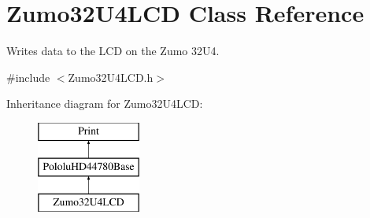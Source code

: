 \hypertarget{class_zumo32_u4_l_c_d}{}\section{Zumo32\+U4\+L\+CD Class Reference}
\label{class_zumo32_u4_l_c_d}


Writes data to the L\+CD on the Zumo 32\+U4.  




{\ttfamily \#include $<$Zumo32\+U4\+L\+C\+D.\+h$>$}

Inheritance diagram for Zumo32\+U4\+L\+CD\+:\begin{figure}[H]
\begin{center}
\leavevmode
\includegraphics[height=3.000000cm]{class_zumo32_u4_l_c_d}
\end{center}
\end{figure}
